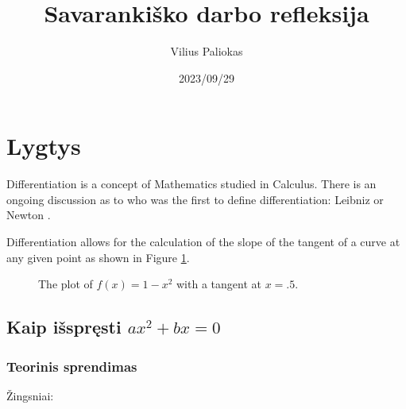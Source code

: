 \documentclass[a4paper]{article}
\title{Savarankiško darbo refleksija}
\author{Vilius Paliokas}
\date{2023/09/29}
\begin{document}
\maketitle

\section{Lygtys}

Differentiation is a concept of Mathematics studied in Calculus. There is an ongoing discussion as to who was the first to define differentiation: Leibniz or Newton \cite{bardi2006calculus}.

Differentiation allows for the calculation of the slope of the tangent of a curve at any given point as shown in Figure \ref{exampleplot}.

\begin{figure}[!htbp]
\begin{center}
\end{center}
\caption{The plot of $f(x)=1-x^2$ with a tangent at $x=.5$.}\label{exampleplot}
\end{figure}


\subsection{Kaip išspręsti $ ax^{2}+bx=0 $}

\subsubsection{Teorinis sprendimas}

Žingsniai: 
\end{document}
